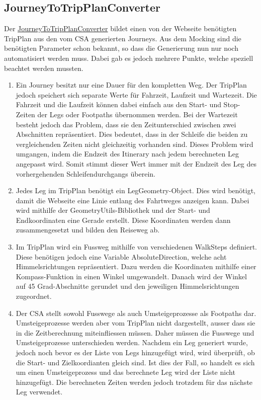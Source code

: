 \subsection{JourneyToTripPlanConverter}
Der \hyperlink{journeyToTripPlanConverter}{JourneyToTripPlanConverter} bildet einen von der Webseite benötigten TripPlan aus den vom CSA generierten Journeys. Aus dem Mocking sind die benötigten Parameter schon bekannt, so dass die Generierung nun nur noch automatisiert werden muss. Dabei gab es jedoch mehrere Punkte, welche speziell beachtet werden mussten.
\begin{enumerate}
	\item Ein Journey besitzt nur eine Dauer für den kompletten Weg. Der TripPlan jedoch speichert sich separate Werte für Fahrzeit, Laufzeit und Wartezeit. Die Fahrzeit und die Laufzeit können dabei einfach aus den Start- und Stop-Zeiten der Legs oder Footpaths übernommen werden. Bei der Wartezeit besteht jedoch das Problem, dass sie den Zeitunterschied zwischen zwei Abschnitten repräsentiert. Dies bedeutet, dass in der Schleife die beiden zu vergleichenden Zeiten nicht gleichzeitig vorhanden sind. Dieses Problem wird umgangen, indem die Endzeit des Itinerary nach jedem berechneten Leg angepasst wird. Somit stimmt dieser Wert immer mit der Endzeit des Leg des vorhergehenden Schleifendurchgangs überein. 
	\item Jedes Leg im TripPlan benötigt ein LegGeometry-Object. Dies wird benötigt, damit die Webseite eine Linie entlang des Fahrtweges anzeigen kann. Dabei wird mithilfe der GeometryUtils-Bibliothek und der Start- und Endkoordinaten eine Gerade erstellt. Diese Koordinaten werden dann zusammengesetzt und bilden den Reiseweg ab.
	\item Im TripPlan wird ein Fussweg mithilfe von verschiedenen WalkSteps definiert. Diese benötigen jedoch eine Variable AbsoluteDirection, welche acht Himmelsrichtungen repräsentiert. Dazu werden die Koordinaten mithilfe einer Kompass-Funktion in einen Winkel umgewandelt. Danach wird der Winkel auf 45 Grad-Abschnitte gerundet und den jeweiligen Himmelsrichtungen zugeordnet.
	\item Der CSA stellt sowohl Fusswege als auch Umsteigeprozesse als Footpaths dar. Umsteigeprozesse werden aber vom TripPlan nicht dargestellt, ausser dass sie in die Zeitberechnung miteinfliessen müssen. Daher müssen die Fusswege und Umsteigeprozesse unterschieden werden. Nachdem ein Leg generiert wurde, jedoch noch bevor es der Liste von Legs hinzugefügt wird, wird überprüft, ob die Start- und Zielkoordianten gleich sind. Ist dies der Fall, so handelt es sich um einen Umsteigeprozess und das berechnete Leg wird der Liste nicht hinzugefügt. Die berechneten Zeiten werden jedoch trotzdem für das nächste Leg verwendet.
\end{enumerate}

